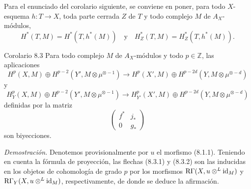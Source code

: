 Para el enunciado del corolario siguiente, se conviene en poner, para todo $X$-esquema $h:T\to X$, toda parte cerrada $Z$ de $T$ y todo complejo $M$ de $A_X$-módulos,
\[
H^*(T,M)=H^*(T,h^*(M))
\quad\text{y}\quad
H^*_Z(T,M)=H^*_Z(T,h^*(M)).
\]

\begin{statement}{Corolario 8.3}
Para todo complejo $M$ de $A_X$-módulos y todo $p\in\mathbb Z$, las aplicaciones
\[
H^p(X,M)\oplus H^{p-2}(Y',M\otimes\mu^{\otimes -1})
\to
H^p(X',M)\oplus H^{p-2d}(Y,M\otimes\mu^{\otimes -d})
\tag{8.3.1}
\]
y
\[
H_Y^p(X,M)\oplus H^{p-2}(Y',M\otimes\mu^{\otimes -1})
\to
H_{Y'}^p(X',M)\oplus H^{p-2d}(Y,M\otimes\mu^{\otimes -d})
\tag{8.3.2}
\]
definidas por la matriz
\[
\begin{pmatrix}
f^*&j_*\\
0&g_*
\end{pmatrix}
\]
son biyecciones.
\end{statement}

\emph{Demostración.} Denotemos provisionalmente por $u$ el morfismo (8.1.1). Teniendo en cuenta la fórmula de proyección, las flechas (8.3.1) y (8.3.2) son las inducidas en los objetos de cohomología de grado $p$ por los morfismos $\mathrm{R}\Gamma(X,u\otimes^L\operatorname{id}_M)$ y $\mathrm{R}\Gamma_Y(X,u\otimes^L\operatorname{id}_M)$, respectivamente, de donde se deduce la afirmación.
